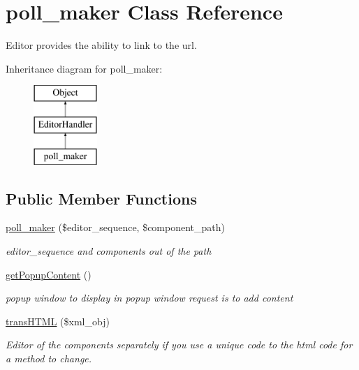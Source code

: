 \hypertarget{classpoll__maker}{}\section{poll\+\_\+maker Class Reference}
\label{classpoll__maker}


Editor provides the ability to link to the url.  


Inheritance diagram for poll\+\_\+maker\+:\begin{figure}[H]
\begin{center}
\leavevmode
\includegraphics[height=3.000000cm]{classpoll__maker}
\end{center}
\end{figure}
\subsection*{Public Member Functions}
\begin{DoxyCompactItemize}
\item 
\hyperlink{classpoll__maker_ae8956a214b15ddd49a3e7538a15791ba}{poll\+\_\+maker} (\$editor\+\_\+sequence, \$component\+\_\+path)
\begin{DoxyCompactList}\small\item\em editor\+\_\+sequence and components out of the path \end{DoxyCompactList}\item 
\hyperlink{classpoll__maker_aa332538c710974acc59a6209bb1f5503}{get\+Popup\+Content} ()
\begin{DoxyCompactList}\small\item\em popup window to display in popup window request is to add content \end{DoxyCompactList}\item 
\hyperlink{classpoll__maker_ac8d4b0f45f16016ad7f711123cc98ea8}{trans\+H\+T\+M\+L} (\$xml\+\_\+obj)
\begin{DoxyCompactList}\small\item\em Editor of the components separately if you use a unique code to the html code for a method to change. \end{DoxyCompactList}\end{DoxyCompactItemize}
